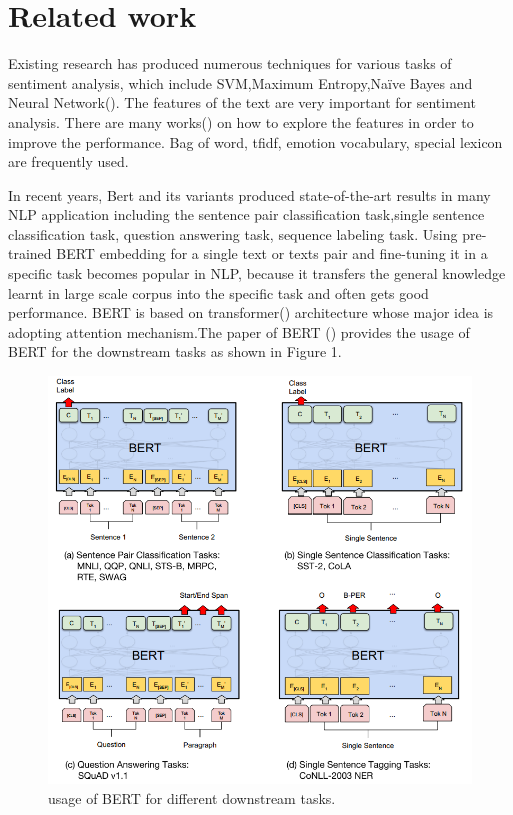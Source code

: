 \documentclass[12pt,twocolumn,letterpaper]{article}
\begin{document}
\section{Related work}
Existing research has produced numerous techniques for various tasks of sentiment analysis, which include SVM,Maximum Entropy,Naïve Bayes and Neural Network(\cite{Ref3}). The features of the text are very important for sentiment analysis. There are many works(\cite{Ref6}) on how to explore the features in order to improve the performance. Bag of word, tfidf, emotion vocabulary, special lexicon are frequently used.  

In recent years, Bert and its variants produced state-of-the-art results in many NLP application including the sentence pair classification task,single sentence classification task, question answering task, sequence labeling task. Using pre-trained BERT embedding for a single text or texts pair and fine-tuning it in a specific task becomes popular in NLP, because it transfers the general knowledge learnt in large scale corpus into the specific task and often gets good performance. BERT is based on transformer(\cite{ref5}) architecture whose major idea is adopting attention mechanism.The paper of BERT (\cite{Ref4}) provides the usage of BERT for the downstream tasks as shown in Figure 1.



\begin{figure}
\begin{center}
\includegraphics[scale=0.9]{bert_all.png}
\end{center}
   \caption{usage of BERT for different downstream tasks.}
\label{fig:short}
\end{figure}
\end{document}
